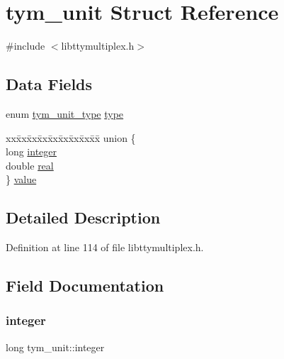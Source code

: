 \hypertarget{structtym__unit}{}\section{tym\+\_\+unit Struct Reference}
\label{structtym__unit}


{\ttfamily \#include $<$libttymultiplex.\+h$>$}

\subsection*{Data Fields}
\begin{DoxyCompactItemize}
\item 
enum \hyperlink{libttymultiplex_8h_a11fda113de846a40d8d1851f94bc4415}{tym\+\_\+unit\+\_\+type} \hyperlink{structtym__unit_aa9af5f13506cbb15b261f7086cb16172}{type}
\item 
\begin{tabbing}
xx\=xx\=xx\=xx\=xx\=xx\=xx\=xx\=xx\=\kill
union \{\\
\>long \hyperlink{structtym__unit_ae3cab379eab2bf726b892c5ad9528368}{integer}\\
\>double \hyperlink{structtym__unit_a1335c8f102b171eae5743a25eaabb5ae}{real}\\
\} \hyperlink{structtym__unit_ab7efee5776cd58e5d8b6806e39a49c49}{value}\\

\end{tabbing}\end{DoxyCompactItemize}


\subsection{Detailed Description}


Definition at line 114 of file libttymultiplex.\+h.



\subsection{Field Documentation}
\mbox{\label{structtym__unit_ae3cab379eab2bf726b892c5ad9528368}} 
\subsubsection{\texorpdfstring{integer}{integer}}
{\footnotesize\ttfamily long tym\+\_\+unit\+::integer}



